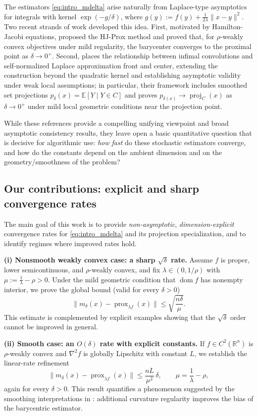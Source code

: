 \documentclass[11pt]{amsart}
\newcommand{\1}{\mathds{1}}
\theoremstyle{definition}
\theoremstyle{remark}
\theoremstyle{definition}
\newcommand{\R}{\mathbb{R}}
\newcommand{\E}{\mathbb{E}}
\newcommand{\prox}{\operatorname{prox}}
\newcommand{\dom}{\operatorname{dom}}
\begin{document}
The estimators \eqref{eq:intro_mdelta} arise naturally from Laplace-type asymptotics for integrals with kernel
\(\exp(-g/\delta)\), where \(g(y):=f(y)+\frac{1}{2\lambda}\|x-y\|^2\). Two recent strands of work developed this idea. First, motivated by Hamilton-Jacobi equations, \cite{MR4581306} proposed the HJ-Prox method and
proved that, for \(\rho\)-weakly convex objectives under mild regularity, the barycenter converges to the proximal point as \(\delta\to0^+\).
Second, \cite{MR4923371} places the relationship between infimal convolutions and self-normalized Laplace approximation
front and center, extending the construction beyond the quadratic kernel and establishing asymptotic validity under
weak local assumptions; in particular, their framework includes smoothed set projections
\(p_{\delta}(x)=\E[Y\mid Y\in C]\) and proves \(p_{\delta(x)}\to \operatorname{proj}_C(x)\) as \(\delta\to0^+\) under mild local geometric
conditions near the projection point.

While these references provide a compelling unifying viewpoint and broad asymptotic consistency results, they leave open
a basic quantitative question that is decisive for algorithmic use: \emph{how fast} do these stochastic estimators converge,
and how do the constants depend on the ambient dimension and on the geometry/smoothness of the problem?



\subsection*{Our contributions: explicit and sharp convergence rates}
The main goal of this work is to provide \emph{non-asymptotic}, \emph{dimension-explicit} convergence rates for
\eqref{eq:intro_mdelta} and its projection specialization, and to identify regimes where improved rates hold. 


\noindent\textbf{(i) Nonsmooth weakly convex case: a sharp \(\sqrt{\delta}\) rate.}
Assume \(f\) is proper, lower semicontinuous, and \(\rho\)-weakly convex, and fix \(\lambda\in(0,1/\rho)\) with
\(\mu:=\frac{1}{\lambda}-\rho>0\). Under the mild geometric condition that \(\dom f\) has nonempty interior,
we prove the global bound (valid for every \(\delta>0\))
\[
\|m_\delta(x)-\prox_{\lambda f}(x)\|\le \sqrt{\frac{n\delta}{\mu}}.
\]
This estimate is complemented by explicit examples showing that the \(\sqrt{\delta}\) order cannot be improved in general.

\noindent\textbf{(ii) Smooth case: an \(O(\delta)\) rate with explicit constants.}
If \(f\in C^2(\R^n)\) is \(\rho\)-weakly convex and \(\nabla^2 f\) is globally Lipschitz with constant \(L\), we establish the
linear-rate refinement
\[
\|m_\delta(x)-\prox_{\lambda f}(x)\|\le \frac{nL}{\mu^2}\,\delta,
\qquad \mu=\frac{1}{\lambda}-\rho,
\]
again for every \(\delta>0\). This result quantifies a phenomenon suggested by the smoothing interpretations in
\cite{MR4581306,MR4923371}: additional curvature regularity improves the bias of the barycentric estimator.
\end{document}
